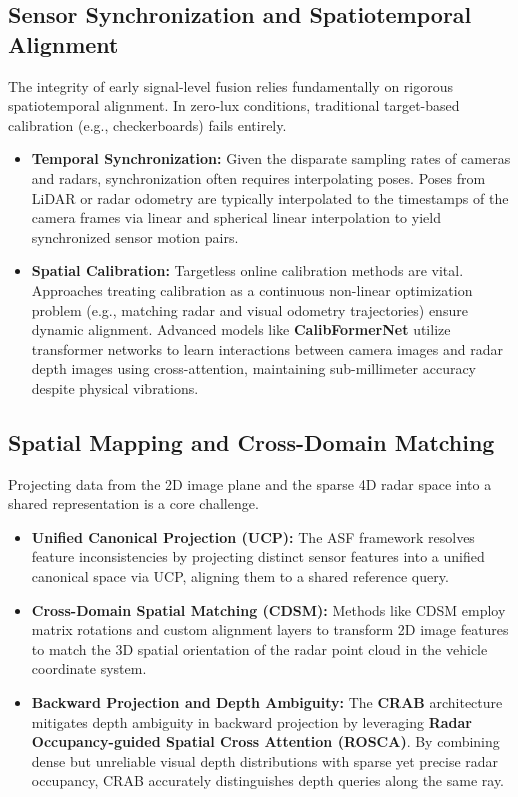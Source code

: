 \documentclass[conference]{IEEEtran}
\begin{document}
\subsection{Sensor Synchronization and Spatiotemporal Alignment}
The integrity of early signal-level fusion relies fundamentally on rigorous spatiotemporal alignment. In zero-lux conditions, traditional target-based calibration (e.g., checkerboards) fails entirely. 
\begin{itemize}
    \item \textbf{Temporal Synchronization:} Given the disparate sampling rates of cameras and radars, synchronization often requires interpolating poses. Poses from LiDAR or radar odometry are typically interpolated to the timestamps of the camera frames via linear and spherical linear interpolation to yield synchronized sensor motion pairs.
    \item \textbf{Spatial Calibration:} Targetless online calibration methods are vital. Approaches treating calibration as a continuous non-linear optimization problem (e.g., matching radar and visual odometry trajectories) ensure dynamic alignment. Advanced models like \textbf{CalibFormerNet} utilize transformer networks to learn interactions between camera images and radar depth images using cross-attention, maintaining sub-millimeter accuracy despite physical vibrations. 
\end{itemize}

\subsection{Spatial Mapping and Cross-Domain Matching}
Projecting data from the 2D image plane and the sparse 4D radar space into a shared representation is a core challenge. 
\begin{itemize}
    \item \textbf{Unified Canonical Projection (UCP):} The ASF framework resolves feature inconsistencies by projecting distinct sensor features into a unified canonical space via UCP, aligning them to a shared reference query.
    \item \textbf{Cross-Domain Spatial Matching (CDSM):} Methods like CDSM employ matrix rotations and custom alignment layers to transform 2D image features to match the 3D spatial orientation of the radar point cloud in the vehicle coordinate system.
    \item \textbf{Backward Projection and Depth Ambiguity:} The \textbf{CRAB} architecture mitigates depth ambiguity in backward projection by leveraging \textbf{Radar Occupancy-guided Spatial Cross Attention (ROSCA)}. By combining dense but unreliable visual depth distributions with sparse yet precise radar occupancy, CRAB accurately distinguishes depth queries along the same ray.
\end{itemize}
\end{document}

